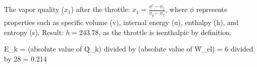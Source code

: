 The vapor quality (\( x_1 \)) after the throttle:  
\( x_1 = \frac{\phi' - \phi_f}{\phi_g - \phi_f} \), where \( \phi \) represents properties such as specific volume (v), internal energy (u), enthalpy (h), and entropy (s).  
Result: \( h = 243.78 \), as the throttle is isenthalpic by definition.

E_k = (absolute value of Q̇_k) divided by (absolute value of Ẇ_el) = 6 divided by 28 = 0.214